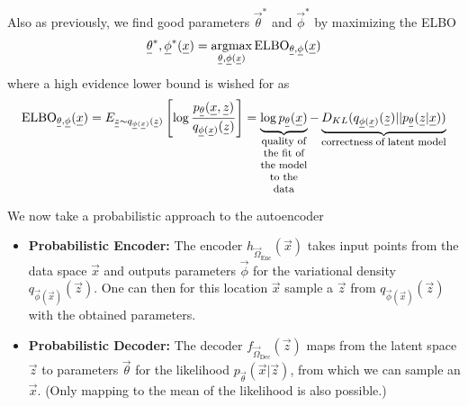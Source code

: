 
Also as previously, we find good parameters $\vec{\theta}^*$ and $\vec{\phi}^*$ by maximizing the ELBO
\begin{equation}
    \vec{\theta}^*, \vec{\phi}^*(\vec{x}) = \argmax_{\vec{\theta}, \vec{\phi}(\vec{x})} \text{ELBO}_{\vec{\theta}, \vec{\phi}}(\vec{x})
\end{equation}
where a high evidence lower bound is wished for as
\begin{equation}
    \text{ELBO}_{\vec{\theta}, \vec{\phi}}(\vec{x}) = E_{\vec{z} \sim q_{\vec{\phi}(\vec{x})}(\vec{z})} \left[ \log \frac{p_\vec{\theta}(\vec{x},\vec{z})}{q_{\vec{\phi}(\vec{x})}(\vec{z})} \right] = \explain{\log p_\vec{\theta}(\vec{x})}{quality of the fit of the model to the data} - \explain{D_{KL}(q_{\vec{\phi}(\vec{x})}(\vec{z}) || p_{\vec{\theta}}(\vec{z}|\vec{x}))}{correctness of latent model}
\end{equation}

We now take a probabilistic approach to the autoencoder
\begin{itemize}
    \item \textbf{Probabilistic Encoder:} The encoder $h_{\vec{\Omega}_{\text{Enc}}}(\vec{x})$ takes input points from the data space $\vec{x}$ and outputs
    parameters $\vec{\phi}$ for the variational density $q_{\vec{\phi}(\vec{x})}(\vec{z})$. One can then
    for this location $\vec{x}$ sample a $\vec{z}$ from $q_{\vec{\phi}(\vec{x})}(\vec{z})$ with the
    obtained parameters. 
    \item \textbf{Probabilistic Decoder:} The decoder $f_{\vec{\Omega}_{\text{Dec}}}(\vec{z})$ maps from the latent space $\vec{z}$ to 
    parameters $\vec{\theta}$ for the likelihood $p_{\vec{\theta}}(\vec{x}|\vec{z})$, from 
    which we can sample an $\vec{x}$. (Only mapping to the mean of the likelihood is also possible.)
\end{itemize}

